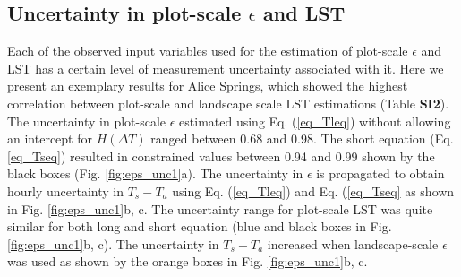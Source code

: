 \documentclass[fleqn,10pt]{wlscirep}
\begin{document}
\subsection{Uncertainty in plot-scale $\epsilon$ and LST}
Each of the observed input variables used for the estimation of plot-scale $\epsilon$ and LST has a certain level of measurement uncertainty associated with it. Here we present an exemplary results for Alice Springs, which showed the highest correlation between plot-scale and landscape scale LST estimations (Table \textbf{SI2}). 
The uncertainty in plot-scale $\epsilon$ estimated using Eq. (\ref{eq_Tleq})  without allowing an intercept for $H(\Delta  T)$ ranged between 0.68 and 0.98. The short equation (Eq.\ref{eq_Tseq}) resulted in constrained values between 0.94 and 0.99 shown by the black boxes (Fig. \ref{fig:eps_unc1}a). The uncertainty in $\epsilon$ is propagated to obtain hourly uncertainty in $T_{s} - T_{a}$ using Eq. (\ref{eq_Tleq}) and Eq. (\ref{eq_Tseq} as shown in Fig. \ref{fig:eps_unc1}b, c. The uncertainty range for plot-scale LST was quite similar for both long and short equation (blue and black boxes in Fig. \ref{fig:eps_unc1}b, c). The uncertainty in $T_{s} - T_{a}$ increased when landscape-scale $\epsilon$ was used as shown by the orange boxes in Fig. \ref{fig:eps_unc1}b, c.
 
\end{document}
